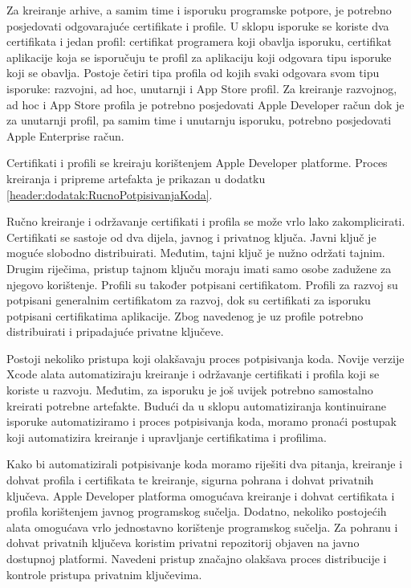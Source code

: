 \documentclass[times, utf8, diplomski, numeric]{fer}
\begin{document}
Za kreiranje arhive, a samim time i isporuku programske potpore, je potrebno posjedovati odgovarajuće certifikate i profile. U sklopu isporuke se koriste dva certifikata i jedan profil: certifikat programera koji obavlja isporuku, certifikat aplikacije koja se isporučuju te profil za aplikaciju koji odgovara tipu isporuke koji se obavlja\citep{codesigning}. Postoje četiri tipa profila od kojih svaki odgovara svom tipu isporuke: razvojni, ad hoc, unutarnji i App Store profil. Za kreiranje razvojnog, ad hoc i App Store profila je potrebno posjedovati Apple Developer račun dok je za unutarnji profil, pa samim time i unutarnju isporuku, potrebno posjedovati Apple Enterprise račun.

Certifikati i profili se kreiraju korištenjem Apple Developer platforme. Proces kreiranja i pripreme artefakta je prikazan u dodatku \ref{header:dodatak:RucnoPotpisivanjaKoda}.

Ručno kreiranje i održavanje certifikati i profila se može vrlo lako zakomplicirati. Certifikati se sastoje od dva dijela, javnog i privatnog ključa. Javni ključ je moguće slobodno distribuirati. Međutim, tajni ključ je nužno održati tajnim. Drugim riječima, pristup tajnom ključu moraju imati samo osobe zadužene za njegovo korištenje. Profili su također potpisani certifikatom. Profili za razvoj su potpisani generalnim certifikatom za razvoj, dok su certifikati za isporuku potpisani certifikatima aplikacije. Zbog navedenog je uz profile potrebno distribuirati i pripadajuće privatne ključeve.

Postoji nekoliko pristupa koji olakšavaju proces potpisivanja koda. Novije verzije Xcode alata automatiziraju kreiranje i održavanje certifikati i profila koji se koriste u razvoju. Međutim, za isporuku je još uvijek potrebno samostalno kreirati potrebne artefakte. Budući da u sklopu automatiziranja kontinuirane isporuke automatiziramo i proces potpisivanja koda, moramo pronaći postupak koji automatizira kreiranje i upravljanje certifikatima i profilima.

Kako bi automatizirali potpisivanje koda moramo riješiti dva pitanja, kreiranje i dohvat profila i certifikata te kreiranje, sigurna pohrana i dohvat privatnih ključeva. Apple Developer platforma omogućava kreiranje i dohvat certifikata i profila korištenjem javnog programskog sučelja. Dodatno, nekoliko postojećih alata omogućava vrlo jednostavno korištenje programskog sučelja. Za pohranu i dohvat privatnih ključeva koristim privatni repozitorij objaven na javno dostupnoj platformi. Navedeni pristup značajno olakšava proces distribucije i kontrole pristupa privatnim ključevima.
\end{document}
